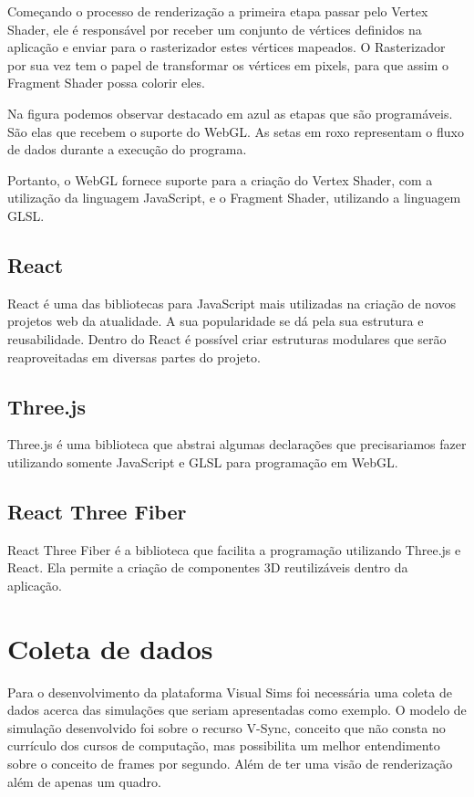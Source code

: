 \documentclass[tcc,capa]{texufpel}
\begin{document}
Começando o processo de renderização a primeira etapa passar pelo Vertex Shader, ele é responsável por receber um conjunto de vértices definidos na aplicação e enviar para o rasterizador estes vértices mapeados. O Rasterizador por sua vez tem o papel de transformar os vértices em pixels, para que assim o Fragment Shader possa colorir eles.

Na figura podemos observar destacado em azul as etapas que são programáveis. São elas que recebem o suporte do WebGL. As setas em roxo representam o fluxo de dados durante a execução do programa. 

Portanto, o WebGL fornece suporte para a criação do Vertex Shader, com a utilização da linguagem JavaScript, e o Fragment Shader, utilizando a linguagem GLSL. 

\subsection{React}

React é uma das bibliotecas para JavaScript mais utilizadas na criação de novos projetos web da atualidade. A sua popularidade se dá pela sua estrutura e reusabilidade. Dentro do React é possível criar estruturas modulares que serão reaproveitadas em diversas partes do projeto. 

\subsection{Three.js}

Three.js é uma biblioteca que abstrai algumas declarações que precisariamos fazer utilizando somente JavaScript e GLSL para programação em WebGL. 

\subsection{React Three Fiber}

React Three Fiber é a biblioteca que facilita a programação utilizando Three.js e React. Ela permite a criação de componentes 3D reutilizáveis dentro da aplicação.

\section{Coleta de dados}

Para o desenvolvimento da plataforma Visual Sims foi necessária uma coleta de dados acerca das simulações que seriam apresentadas como exemplo. O modelo de simulação desenvolvido foi sobre o recurso V-Sync, conceito que não consta no currículo dos cursos de computação, mas possibilita um melhor entendimento sobre o conceito de frames por segundo. Além de ter uma visão de renderização além de apenas um quadro.
\end{document}
